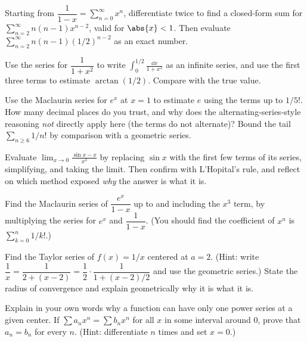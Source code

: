 \begin{exercise}
Starting from $\dfrac{1}{1-x} = \sum_{n=0}^\infty x^n$, differentiate twice to find a closed-form sum for $\sum_{n=2}^{\infty} n(n-1)x^{n-2}$, valid for $\abs{x}<1$. Then evaluate $\sum_{n=2}^{\infty} n(n-1)(1/2)^{n-2}$ as an exact number.
\end{exercise}

\begin{exercise}
Use the series for $\dfrac{1}{1+x^2}$ to write $\displaystyle\int_0^{1/2}\frac{\dd x}{1+x^2}$ as an infinite series, and use the first three terms to estimate $\arctan(1/2)$. Compare with the true value.
\end{exercise}

\begin{exercise}
Use the Maclaurin series for $e^x$ at $x=1$ to estimate $e$ using the terms up to $1/5!$. How many decimal places do you trust, and why does the alternating-series-style reasoning \emph{not} directly apply here (the terms do not alternate)? Bound the tail $\sum_{n\ge 6} 1/n!$ by comparison with a geometric series.
\end{exercise}

\begin{exercise}
Evaluate $\displaystyle\lim_{x\to 0}\frac{\sin x - x}{x^3}$ by replacing $\sin x$ with the first few terms of its series, simplifying, and taking the limit. Then confirm with L'Hopital's rule, and reflect on which method exposed \emph{why} the answer is what it is.
\end{exercise}

\begin{exercise}
Find the Maclaurin series of $\dfrac{e^x}{1-x}$ up to and including the $x^3$ term, by multiplying the series for $e^x$ and $\dfrac{1}{1-x}$. (You should find the coefficient of $x^n$ is $\sum_{k=0}^{n} 1/k!$.)
\end{exercise}

\begin{exercise}
Find the Taylor series of $f(x) = 1/x$ centered at $a = 2$. (Hint: write $\dfrac{1}{x} = \dfrac{1}{2 + (x-2)} = \dfrac{1}{2}\cdot\dfrac{1}{1 + (x-2)/2}$ and use the geometric series.) State the radius of convergence and explain geometrically why it is what it is.
\end{exercise}

\begin{exercise}
Explain in your own words why a function can have only one power series at a given center. If $\sum a_n x^n = \sum b_n x^n$ for all $x$ in some interval around $0$, prove that $a_n = b_n$ for every $n$. (Hint: differentiate $n$ times and set $x=0$.)
\end{exercise}

